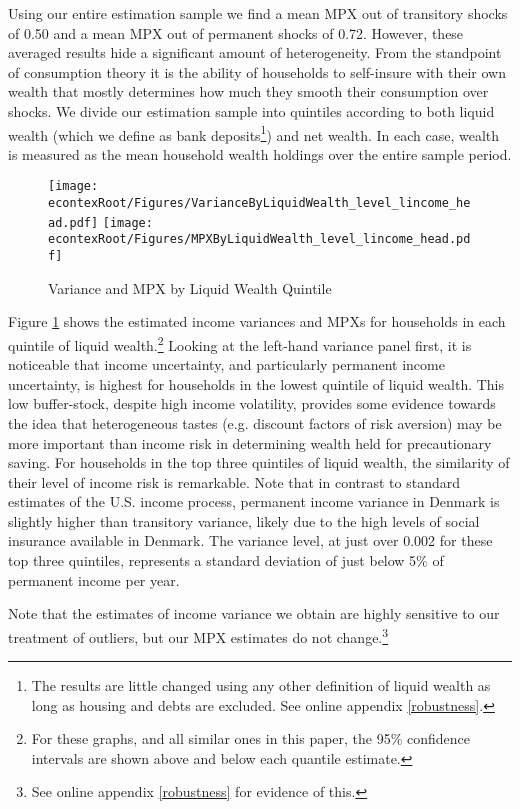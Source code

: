 \documentclass[titlepage]{\econtex}\newcommand{\texname}{ConsumptionHeterogeneity}
\begin{document}
	Using our entire estimation sample we find a mean MPX out of transitory shocks of 0.50 and a mean MPX out of permanent shocks of 0.72. However, these averaged results hide a significant amount of heterogeneity. From the standpoint of consumption theory it is the ability of households to self-insure with their own wealth that mostly determines how much they smooth their consumption over shocks. We divide our estimation sample into quintiles according to both liquid wealth (which we define as bank deposits\footnote{The results are little changed using any other definition of liquid wealth as long as housing and debts are excluded. See online appendix \ref{robustness}.}) and net wealth. In each case, wealth is measured as the mean household wealth holdings over the entire sample period.
	\begin{figure}
		\centering
		\texttt{[image: \\econtexRoot/Figures/VarianceByLiquidWealth\_level\_lincome\_head.pdf]}
		\centering
		\texttt{[image: \\econtexRoot/Figures/MPXByLiquidWealth\_level\_lincome\_head.pdf]}
		\caption{Variance and MPX by Liquid Wealth Quintile}
		\label{fig:MPXByLiquidWealth}
	\end{figure}
	
	Figure \ref{fig:MPXByLiquidWealth} shows the estimated income variances and MPXs for households in each quintile of liquid wealth.\footnote{For these graphs, and all similar ones in this paper, the 95\% confidence intervals are shown above and below each quantile estimate.} Looking at the left-hand variance panel first, it is noticeable that income uncertainty, and particularly permanent income uncertainty, is highest for households in the lowest quintile of liquid wealth. This low buffer-stock, despite high income volatility, provides some evidence towards the idea that heterogeneous tastes (e.g. discount factors of risk aversion) may be more important than income risk in determining wealth held for precautionary saving. For households in the top three quintiles of liquid wealth, the similarity of their level of income risk is remarkable. Note that in contrast to standard estimates of the U.S. income process, permanent income variance in Denmark is slightly higher than transitory variance, likely due to the high levels of social insurance available in Denmark. The variance level, at just over 0.002 for these top three quintiles, represents a standard deviation of just below 5\% of permanent income per year.
	
	Note that the estimates of income variance we obtain are highly sensitive to our treatment of outliers, but our MPX estimates do not change.\footnote{See online appendix \ref{robustness} for evidence of this.}
	
\end{document}
